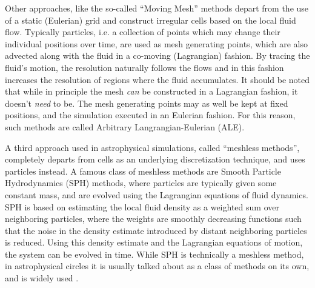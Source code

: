 Other approaches, like the so-called ``Moving Mesh'' methods \citep[e.g][]{springelPurSiMuove2010,
vandenbrouckeMovingMeshCode2016, gaburovMagneticallyLevitatingAccretion2012} depart from the use of
a static (Eulerian) grid and construct irregular cells based on the local fluid flow. Typically
particles, i.e. a collection of points which may change their individual positions  over time, are
used as mesh generating points, which are also advected along with the fluid in a co-moving
(Lagrangian) fashion. By tracing the fluid's motion, the resolution naturally follows the flows and
in this fashion increases the resolution of regions where the fluid accumulates. It should be noted
that while in principle the mesh \emph{can} be constructed in a Lagrangian fashion, it doesn't
\emph{need} to be. The mesh generating points may as well be kept at fixed positions, and the
simulation executed in an Eulerian fashion. For this reason, such methods are called Arbitrary
Langrangian-Eulerian (ALE).


A third approach used in astrophysical simulations, called ``meshless methods'', completely departs
from cells as an underlying discretization technique, and uses particles instead. A famous class of
meshless methods are Smooth Particle Hydrodynamics (SPH) methods, where particles are typically
given some constant mass, and are evolved using the Lagrangian equations of fluid dynamics. SPH is
based on estimating the local fluid density as a weighted sum over neighboring particles, where the
weights are smoothly decreasing functions such that the noise in the density estimate introduced by
distant neighboring particles is reduced. Using this density estimate and the Lagrangian equations
of motion, the system can be evolved in time. While SPH is technically a meshless method, in
astrophysical circles it is usually talked about as a class of methods on its own, and is widely
used \citep[e.g.][]{springelCosmologicalSimulationCode2005, wadsleyGasoline2ModernSmoothed2017,
rosswogLagrangianHydrodynamicsCode2020, menonAdaptiveTechniquesClustered2015,
gonnetSWIFTFastAlgorithms2013}.


